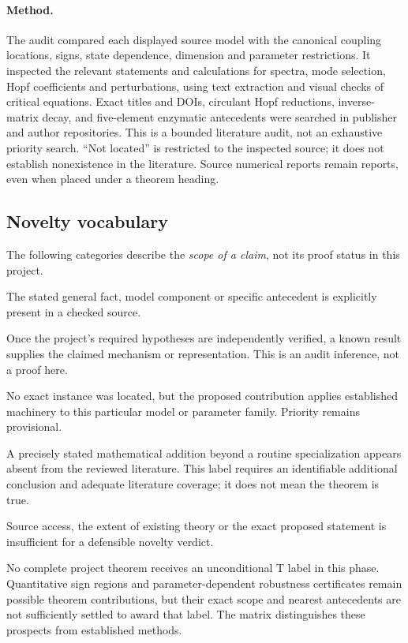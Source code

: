\paragraph{Method.}
The audit compared each displayed source model with the canonical coupling
locations, signs, state dependence, dimension and parameter restrictions.
It inspected the relevant statements and calculations for spectra, mode
selection, Hopf coefficients and perturbations, using text extraction and
visual checks of critical equations. Exact titles and DOIs, circulant Hopf
reductions, inverse-matrix decay, and five-element enzymatic antecedents
were searched in publisher and author repositories. This is a bounded
literature audit, not an exhaustive priority search. ``Not located'' is
restricted to the inspected source; it does not establish nonexistence in
the literature. Source numerical reports remain reports, even when placed
under a theorem heading.

\subsection{Novelty vocabulary}
The following categories describe the \emph{scope of a claim}, not its proof
status in this project.
\begin{description}[style=nextline]
\item[Definitely known (K).] The stated general fact, model component or
specific antecedent is explicitly present in a checked source.
\item[Directly implied by known theory (D).] Once the project's required
hypotheses are independently verified, a known result supplies the claimed
mechanism or representation. This is an audit inference, not a proof here.
\item[Apparently new specialization (S).] No exact instance was located,
but the proposed contribution applies established machinery to this
particular model or parameter family. Priority remains provisional.
\item[Apparently new theorem (T).] A precisely stated mathematical addition
beyond a routine specialization appears absent from the reviewed literature.
This label requires an identifiable additional conclusion and adequate
literature coverage; it does not mean the theorem is true.
\item[Unresolved because more literature is needed (U).] Source access,
the extent of existing theory or the exact proposed statement is insufficient
for a defensible novelty verdict.
\end{description}
No complete project theorem receives an unconditional T label in this
phase. Quantitative sign regions and parameter-dependent robustness
certificates remain possible theorem contributions, but their exact scope
and nearest antecedents are not sufficiently settled to award that label.
The matrix distinguishes these prospects from established methods.

